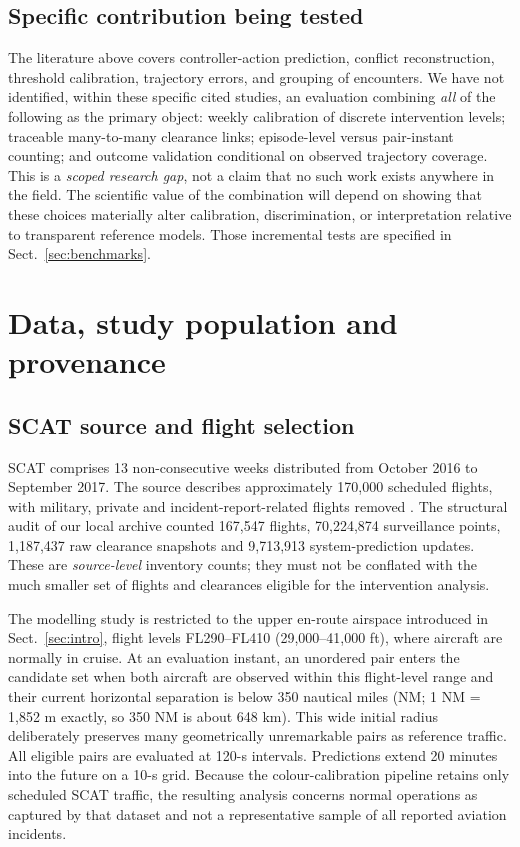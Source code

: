 \documentclass[pdflatex,sn-mathphys-num]{sn-jnl}
\begin{document}
\subsection{Specific contribution being tested}
The literature above covers controller-action prediction, conflict reconstruction, threshold calibration, trajectory errors, and grouping of encounters. We have not identified, within these specific cited studies, an evaluation combining \emph{all} of the following as the primary object: weekly calibration of discrete intervention levels; traceable many-to-many clearance links; episode-level versus pair-instant counting; and outcome validation conditional on observed trajectory coverage. This is a \emph{scoped research gap}, not a claim that no such work exists anywhere in the field. The scientific value of the combination will depend on showing that these choices materially alter calibration, discrimination, or interpretation relative to transparent reference models. Those incremental tests are specified in Sect.~\ref{sec:benchmarks}.

\section{Data, study population and provenance}\label{sec:data}
\subsection{SCAT source and flight selection}
SCAT comprises 13 non-consecutive weeks distributed from October 2016 to September 2017. The source describes approximately 170,000 scheduled flights, with military, private and incident-report-related flights removed \cite{nilsson2023}. The structural audit of our local archive counted 167,547 flights, 70,224,874 surveillance points, 1,187,437 raw clearance snapshots and 9,713,913 system-prediction updates. These are \emph{source-level} inventory counts; they must not be conflated with the much smaller set of flights and clearances eligible for the intervention analysis.

The modelling study is restricted to the upper en-route airspace introduced in Sect.~\ref{sec:intro}, flight levels FL290--FL410 (29,000--41,000 ft), where aircraft are normally in cruise. At an evaluation instant, an unordered pair enters the candidate set when both aircraft are observed within this flight-level range and their current horizontal separation is below 350 nautical miles (NM; 1 NM = 1,852 m exactly, so 350 NM is about 648 km). This wide initial radius deliberately preserves many geometrically unremarkable pairs as reference traffic. All eligible pairs are evaluated at 120-s intervals. Predictions extend 20 minutes into the future on a 10-s grid. Because the colour-calibration pipeline retains only scheduled SCAT traffic, the resulting analysis concerns normal operations as captured by that dataset and not a representative sample of all reported aviation incidents.
\end{document}
